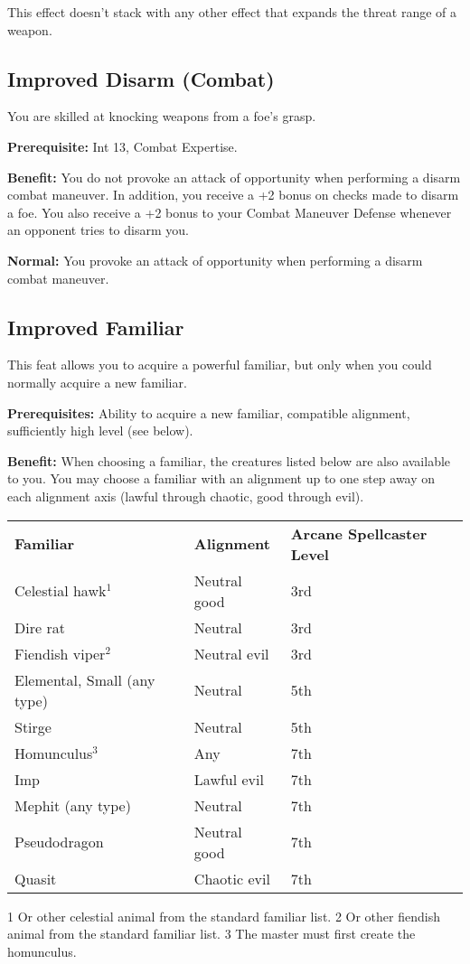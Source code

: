 This effect doesn't stack with any other effect that expands the threat range of a weapon.
				
\subsection{Improved Disarm (Combat)}

				
You are skilled at knocking weapons from a foe's grasp.
				
\textbf{Prerequisite:} Int 13, Combat Expertise.
				
\textbf{Benefit:} You do not provoke an attack of opportunity when performing a disarm combat maneuver. In addition, you receive a +2 bonus on checks made to disarm a foe. You also receive a +2 bonus to your Combat Maneuver Defense whenever an opponent tries to disarm you.
				
\textbf{Normal:} You provoke an attack of opportunity when performing a disarm combat maneuver.
				
\subsection{Improved Familiar}

				
This feat allows you to acquire a powerful familiar, but only when you could normally acquire a new familiar.
				
\textbf{Prerequisites:} Ability to acquire a new familiar, compatible alignment, sufficiently high level (see below).
				
\textbf{Benefit:} When choosing a familiar, the creatures listed below are also available to you. You may choose a familiar with an alignment up to one step away on each alignment axis (lawful through chaotic, good through evil).

\begin{table}
\sffamily
\begin{tabular}{lll}
\textbf{Familiar} & \textbf{Alignment} & \textbf{Arcane Spellcaster Level}\\

Celestial hawk\(^{1}\) & Neutral good & 3rd\\
Dire rat & Neutral & 3rd\\
Fiendish viper\(^{2}\) & Neutral evil & 3rd\\
Elemental, Small (any type) & Neutral & 5th\\
Stirge& Neutral & 5th\\
Homunculus\(^{3}\) & Any & 7th\\
Imp & Lawful evil & 7th\\
Mephit (any type) & Neutral & 7th\\
Pseudodragon & Neutral good & 7th\\
Quasit & Chaotic evil & 7th\\
\end{tabular}
1 Or other celestial animal from the standard familiar list.
2 Or other fiendish animal from the standard familiar list.
3 The master must first create the homunculus.

\end{table}

